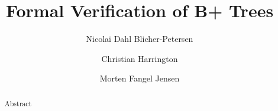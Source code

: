 \documentclass[oribibl]{llncs}
\begin{document}
\mainmatter
\title{Formal Verification of B+ Trees}
\author{Nicolai Dahl Blicher-Petersen \and Christian Harrington \and Morten Fangel Jensen \\
}

\maketitle

\begin{abstract}
Abstract
\end{abstract}










\end{document}
